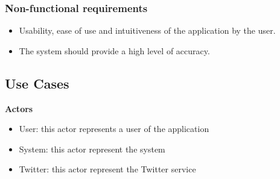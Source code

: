 \documentclass[a4paper, oneside]{article}
\begin{document}
\subsubsection{Non-functional requirements}
\begin{itemize}
\item Usability, ease of use and intuitiveness of the application by the user.
\item The system should provide a high level of accuracy.
\end{itemize}

\clearpage

\subsection{Use Cases}

\textbf{Actors}
\begin{itemize}
\item{User: this actor represents a user of the application}
\item{System: this actor represent the system}
\item{Twitter: this actor represent the Twitter service}
\end{itemize}
\end{document}

